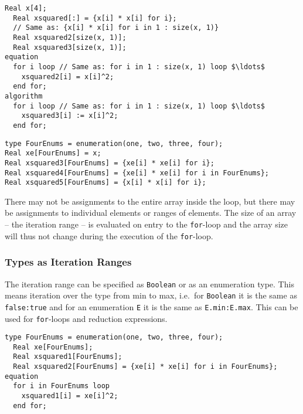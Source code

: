 \begin{example}
\begin{lstlisting}[language=modelica]
  Real x[4];
  Real xsquared[:] = {x[i] * x[i] for i};
  // Same as: {x[i] * x[i] for i in 1 : size(x, 1)}
  Real xsquared2[size(x, 1)];
  Real xsquared3[size(x, 1)];
equation
  for i loop // Same as: for i in 1 : size(x, 1) loop $\ldots$
    xsquared2[i] = x[i]^2;
  end for;
algorithm
  for i loop // Same as: for i in 1 : size(x, 1) loop $\ldots$
    xsquared3[i] := x[i]^2;
  end for;
\end{lstlisting}

\begin{lstlisting}[language=modelica]
type FourEnums = enumeration(one, two, three, four);
Real xe[FourEnums] = x;
Real xsquared3[FourEnums] = {xe[i] * xe[i] for i};
Real xsquared4[FourEnums] = {xe[i] * xe[i] for i in FourEnums};
Real xsquared5[FourEnums] = {x[i] * x[i] for i};
\end{lstlisting}
\end{example}

There may not be assignments to the entire array inside the loop, but there may be assignments to individual elements or ranges of elements.
The size of an array -- the iteration range -- is evaluated on entry to the \lstinline!for!-loop and the array size will thus not change during the execution of the \lstinline!for!-loop.

\subsubsection{Types as Iteration Ranges}\label{types-as-iteration-ranges}

The iteration range can be specified as \lstinline!Boolean! or as an enumeration type.
This means iteration over the type from min to max, i.e.\ for \lstinline!Boolean! it is the same as \lstinline!false:true! and for an enumeration \lstinline!E! it is the same as \lstinline!E.min:E.max!.
This can be used for \lstinline!for!-loops and reduction expressions.

\begin{example}
\begin{lstlisting}[language=modelica]
  type FourEnums = enumeration(one, two, three, four);
  Real xe[FourEnums];
  Real xsquared1[FourEnums];
  Real xsquared2[FourEnums] = {xe[i] * xe[i] for i in FourEnums};
equation
  for i in FourEnums loop
    xsquared1[i] = xe[i]^2;
  end for;
\end{lstlisting}
\end{example}

